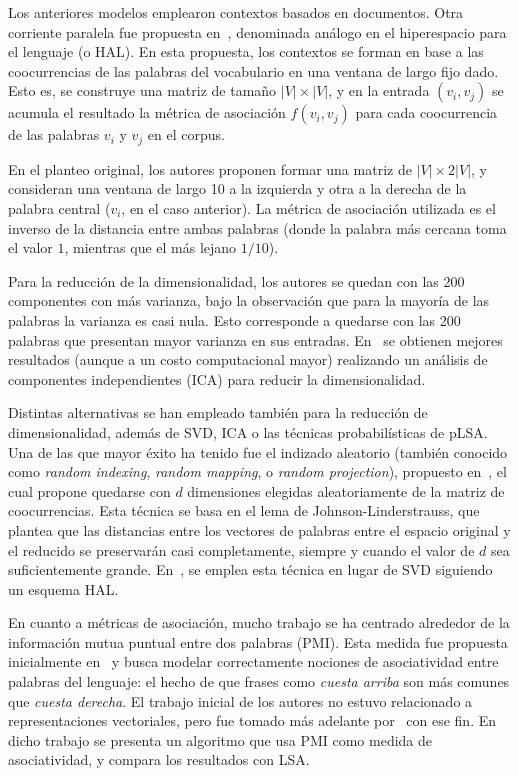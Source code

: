 Los anteriores modelos emplearon contextos basados en documentos. Otra corriente paralela fue
propuesta en~\cite{Lund1995, LundBurgess1996}, denominada análogo en el hiperespacio para el
lenguaje (o HAL). En esta propuesta, los contextos se forman en base a las coocurrencias de las
palabras del vocabulario en una ventana de largo fijo dado. Esto es, se construye una matriz de
tamaño $|V| \times |V|$, y en la entrada $(v_i, v_j)$ se acumula el resultado la métrica de
asociación $f(v_i, v_j)$ para cada coocurrencia de las palabras $v_i$ y $v_j$ en el corpus.

En el planteo original, los autores proponen formar una matriz de $|V| \times 2|V|$, y consideran
una ventana de largo 10 a la izquierda y otra a la derecha de la palabra central ($v_i$, en el caso
anterior). La métrica de asociación utilizada es el inverso de la distancia entre ambas palabras
(donde la palabra más cercana toma el valor $1$, mientras que el más lejano $1/10$).

Para la reducción de la dimensionalidad, los autores se quedan con las 200 componentes con más
varianza, bajo la observación que para la mayoría de las palabras la varianza es casi nula. Esto
corresponde a quedarse con las 200 palabras que presentan mayor varianza en sus entradas.
En~\cite{VayrynenHonkela2004} se obtienen mejores resultados (aunque a un costo computacional mayor)
realizando un análisis de componentes independientes (ICA) para reducir la dimensionalidad.


Distintas alternativas se han empleado también para la reducción de dimensionalidad, además de SVD,
ICA o las técnicas probabilísticas de pLSA\@. Una de las que mayor éxito ha tenido fue el indizado
aleatorio (también conocido como \textit{random indexing}, \textit{random mapping}, o \textit{random
projection}), propuesto en~\cite{Kaski1998}, el cual propone quedarse con $d$ dimensiones elegidas
aleatoriamente de la matriz de coocurrencias. Esta técnica se basa en el lema de
Johnson-Linderstrauss, que plantea que las distancias entre los vectores de palabras entre el
espacio original y el reducido se preservarán casi completamente, siempre y cuando el valor de $d$
sea suficientemente grande. En~\cite{Sahlgren2001}, se emplea esta técnica en lugar de SVD siguiendo
un esquema HAL\@.


En cuanto a métricas de asociación, mucho trabajo se ha centrado alrededor de la información mutua
puntual entre dos palabras (PMI). Esta medida fue propuesta inicialmente en~\cite{ChurchHanks1990} y
busca modelar correctamente nociones de asociatividad entre palabras del lenguaje: el hecho de que
frases como \textit{cuesta arriba} son más comunes que \textit{cuesta derecha}. El trabajo inicial
de los autores no estuvo relacionado a representaciones vectoriales, pero fue tomado más adelante
por~\cite{Turney2001} con ese fin. En dicho trabajo se presenta un algoritmo que usa PMI como medida
de asociatividad, y compara los resultados con LSA\@.

